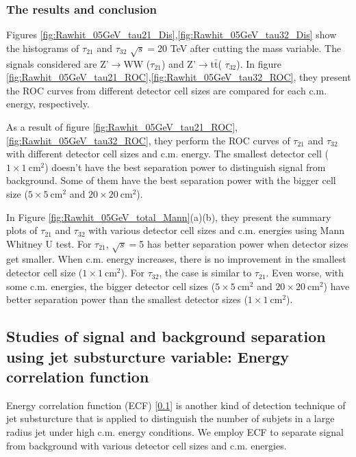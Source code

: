 \subsubsection{The results and conclusion}
Figures \ref{fig:Rawhit_05GeV_tau21_Dis},\ref{fig:Rawhit_05GeV_tau32_Dis} show the histograms of $\tau_{21}$ and $\tau_{32}$ $\sqrt{s}=$20 TeV after cutting the mass variable. The signals considered are Z'$\rightarrow$WW ($\tau_{21}$) and Z'$\rightarrow$t$\bar{\mathrm{t}}$( $\tau_{32}$). In figure \ref{fig:Rawhit_05GeV_tau21_ROC},\ref{fig:Rawhit_05GeV_tau32_ROC}, they present the ROC curves from different detector cell sizes are compared for each c.m. energy, respectively. 

As a result of figure \ref{fig:Rawhit_05GeV_tau21_ROC}, \ref{fig:Rawhit_05GeV_tau32_ROC}, they perform the ROC curves of $\tau_{21}$ and $\tau_{32}$ with different detector cell sizes and c.m. energy. The smallest detector cell ($1\times1~\mathrm{cm}^2$) doesn't have the best separation power to distinguish signal from background. Some of them have the best separation power with the bigger cell size ($5\times5~\mathrm{cm}^2$ and $20\times20~\mathrm{cm}^2$).

In Figure \ref{fig:Rawhit_05GeV_total_Mann}(a)(b), they present the summary plots of $\tau_{21}$ and $\tau_{32}$ with various detector cell sizes and c.m. energies using Mann Whitney U test. For $\tau_{21}$, $\sqrt{s}=$5 has better separation power when detector sizes get smaller. When c.m. energy increases, there is no improvement in the smallest detector cell size ($1\times1~\mathrm{cm}^2$). For $\tau_{32}$, the case is similar to  $\tau_{21}$. Even worse, with some c.m. energies, the bigger detector cell sizes ($5\times5~\mathrm{cm}^2$ and $20\times20~\mathrm{cm}^2$) have better separation power than the smallest detector sizes ($1\times1~\mathrm{cm}^2$). 


\subsection{Studies of signal and background separation using jet substurcture variable: Energy correlation function}
Energy correlation function (ECF) [\ref{}] is another kind of detection technique of jet substurcture that is applied to distinguish the number of subjets in a large radius jet under high c.m. energy conditions. We employ ECF to separate signal from background with various detector cell sizes and c.m. energies. 
